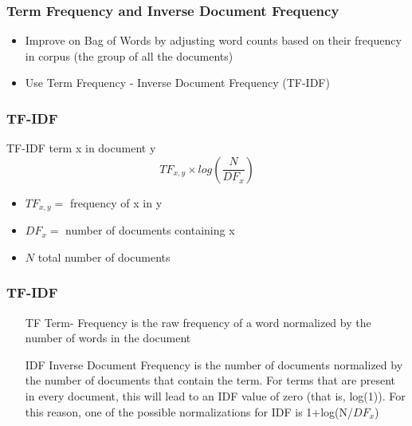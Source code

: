\documentclass[compress, aspectratio=54]{beamer}
\begin{document}
\begin{frame}
\frametitle{Term Frequency and Inverse Document Frequency}
\begin{itemize}

\item Improve on Bag of Words by adjusting word
counts based on their frequency in corpus (the group of
all the documents)

\item Use Term Frequency - Inverse Document Frequency (TF-IDF)
\end{itemize}


\end{frame}


\begin{frame}
\frametitle{TF-IDF}
TF-IDF term x in document y
\[
TF_{x,y} \times log (\frac{N}{DF_x} )
\]
\begin{itemize}
\item $ TF_{x,y} =$ frequency of x in y
\item $DF_x =$ number of documents containing x
\item $N$ total number of documents
\end{itemize}

\end{frame}



\begin{frame}
\frametitle{TF-IDF}
\begin{itemize}

\item[TF]  Term- Frequency is the raw frequency of a word normalized by the number of words in the document
\item [IDF] Inverse Document Frequency is the number of documents normalized by the number of documents that contain the term. For terms that are present in every document, this will lead to an IDF value of zero (that is, log(1)). For this reason, one of the possible normalizations for IDF is 1+log(N/$DF_x$)

\end{itemize}

\end{frame}
\end{document}
